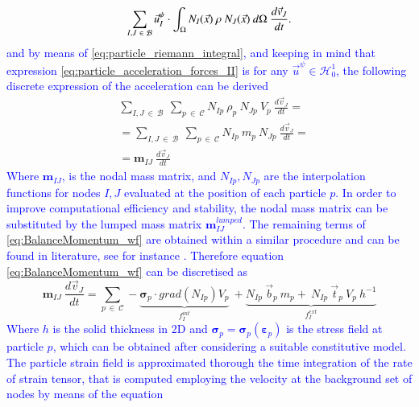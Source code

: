 \documentclass[preprint,12pt,a4paper]{elsarticle}
\newcommand{\tens}[1]{
  \ensuremath{\mathbf{{#1}}}
}
\newcommand\Grad[1]{grad({#1})}
\newcommand{\Integral}[2]{
  \IfStrEqCase{#1}{
    {2}{\ensuremath{\int_{\Gamma_d}{#2}\ d\Gamma}}
    {3}{\ensuremath{\int_{\Omega}{#2}\ d\Omega}}
  }
}
\begin{document}
\begin{equation}
    \label{eq:particle_acceleration_forces_II}
    \sum_{I,J\ \in\ \mathcal{B}} \vec{u}_I^{\psi} \cdot \Integral{3}{ N_I(\vec{x})\ \rho\ N_J(\vec{x})}\ \frac{d\vec{v}_J}{dt}.
\end{equation}
\textcolor{blue}{and by means of \eqref{eq:particle_riemann_integral}, and keeping in mind that expression \eqref{eq:particle_acceleration_forces_II} is for any $\vec{u}^{\psi} \in
\mathcal{H}^1_0$, the following discrete expression of the acceleration can be derived}
\begin{equation}
\label{eq:particle_acceleration_forces_III}
\begin{split}
&\sum_{I,J\ \in\ \mathcal{B}}\ \sum_{p\ \in\ \mathcal{C}} N_{Ip}\ \rho_p\ N_{Jp}\ V_p\ \frac{d\vec{v}_J}{dt} = \\
&=\sum_{I,J\ \in\ \mathcal{B}}\ \sum_{p\ \in\ \mathcal{C}} N_{Ip}\ m_p\ N_{Jp}\ \frac{d\vec{v}_J}{dt} = \\
&= \tens{m}_{IJ}\ \frac{d\vec{v}_J}{dt}
\end{split}
\end{equation}
\textcolor{blue}{Where $\tens{m}_{IJ}$, is the nodal mass matrix, and $N_{Ip}, N_{Jp}$ are the interpolation functions for nodes $I,J$ evaluated at the position of each particle $p$. In order to improve computational efficiency and stability, the nodal mass matrix can be substituted by the lumped mass matrix $\tens{m}_{IJ}^{lumped}$. The remaining terms of \eqref{eq:BalanceMomentum_wf} are obtained within a similar procedure and can be found in literature, see for instance \cite{Zhang_book_2016}. Therefore equation \eqref{eq:BalanceMomentum_wf} can be discretised as}
\begin{equation}
\label{eq:BalanceMomentum_wf_discretized}
    \tens{m}_{IJ}\ \frac{d\vec{v}_J}{dt} = \sum_{p\ \in\ \mathcal{C}} - \underbrace{\tens{\sigma}_{p} \cdot \Grad{N_{Ip}} V_p}_{f^{int}_I}\ + \underbrace{N_{Ip}\ \vec{b}_{p}\ m_p  +\ N_{Ip}\ \vec{t}_{p}\ V_p\ h^{-1}}_{f^{ext}_I}
\end{equation}
\textcolor{blue}{Where $h$ is the solid thickness in 2D and $\tens{\sigma}_{p} = \tens{\sigma}_{p}(\tens{\varepsilon}_{p})$
is the stress field at particle $p$, which can be obtained after considering a suitable constitutive model. The particle strain field is approximated thorough the time integration of the rate of strain tensor, that is computed employing the velocity at the background set of nodes by means of the equation}
\end{document}
